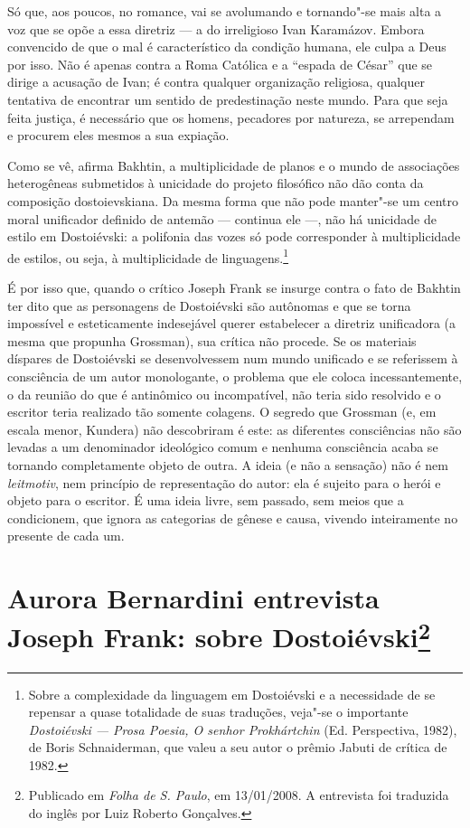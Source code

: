 Só que, aos poucos, no romance, vai se avolu­mando e tornando"-se mais
alta a voz que se opõe a essa diretriz --- a do irreligioso Ivan
Karamázov. Embora convencido de que o mal é característico da condição
humana, ele culpa a Deus por isso. Não é apenas contra a Roma Católica e
a ``espada de César'' que se dirige a acusação de Ivan; é contra
qualquer organização religiosa, qualquer tentativa de encontrar um
sentido de predestinação neste mundo. Para que seja feita justiça, é
necessário que os homens, pecadores por natureza, se arrependam e
procu­rem eles mesmos a sua expiação.

Como se vê, afirma Bakhtin, a multiplicidade de planos e o mundo de
associações heterogêneas submetidos à unicidade do projeto filosófico
não dão conta da composição dostoievskiana. Da mesma forma que não pode
manter"-se um centro moral unificador definido de antemão --- continua ele
---, não há unicidade de estilo em Dostoiévski: a polifonia das vozes só
pode corresponder à multiplicidade de estilos, ou seja, à multiplicidade
de linguagens.\footnote{Sobre a complexidade da linguagem em Dostoiévski
e a necessidade de se repensar a quase totalidade de suas traduções,
veja"-se o importante \emph{Dostoiévski --- Prosa Poesia, O senhor
Prokhártchin} (Ed. Perspectiva, 1982), de Boris Schnaiderman, que
valeu a seu autor o prêmio Jabuti de crítica de 1982.}

É por isso que, quando o crítico Joseph Frank se insurge contra o fato
de Bakhtin ter dito que as personagens de Dostoiévski são autônomas e
que se torna impossível e esteticamente indesejável querer estabelecer a
diretriz unificadora (a mesma que propunha Grossman), sua crítica não
procede. Se os materiais díspares de Dostoiévski se desenvolvessem num
mundo unificado e se referissem à consciência de um autor monologante, o
problema que ele coloca incessantemente, o da reunião do que é
antinômico ou incompatível, não teria sido resolvido e o escritor teria
realizado tão somente colagens. O segredo que Grossman (e, em escala
menor, Kundera) não descobriram é este: as diferentes consciências não
são levadas a um denominador ideológico comum e nenhuma consciência
acaba se tornando completamente objeto de outra. A ideia (e não a
sensação) não é nem \emph{leitmotiv}, nem princípio de representação do
autor: ela é sujeito para o herói e objeto para o escritor. É uma ideia
livre, sem passado, sem meios que a condicionem, que ignora as
categorias de gênese e causa, vivendo inteiramente no presente de cada
um.

\chapter*{Aurora Bernardini entrevista Joseph Frank: sobre Dostoiévski\footnote{Publicado em \emph{Folha de S. Paulo}, em 13/01/2008. A entrevista foi traduzida do inglês por Luiz Roberto Gonçalves.}}

